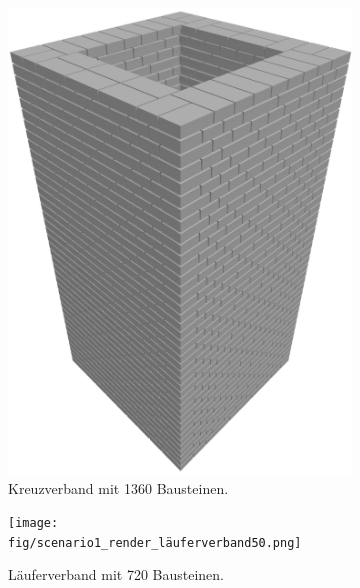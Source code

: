 \begin{figure}[htb]
    \begin{subfigure}[b]{0.3\columnwidth}
      \includegraphics[width=\columnwidth]{fig/scenario1_render_crossbond.png}
      \caption{Kreuzverband mit 1360 Bausteinen.}\label{fig:poc:render_crossbond}
    \end{subfigure}
    \hfill
    \begin{subfigure}[b]{0.3\columnwidth}
      \texttt{[image: fig/scenario1\_render\_läuferverband50.png]}
      \caption{Läuferverband mit 720 Bausteinen.}\label{fig:poc:render_laeuferverband50}
    \end{subfigure}
    \hfill
    \begin{subfigure}[b]{0.3\columnwidth}

\end{subfigure}
\end{figure}
